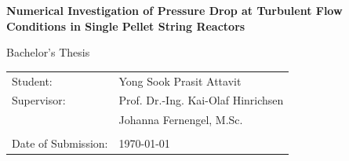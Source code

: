 %
%
%
\begin{titlepage}
	\thispagestyle{firstpage}
	\vspace*{1cm}
	\begingroup 
	\fontsize{30}{30}\sffamily\selectfont
	\textbf{Numerical Investigation of Pressure \newline Drop at Turbulent Flow Conditions in Single Pellet String Reactors}
	\par
	\endgroup
	
	\begingroup
	\fontsize{24}{24}\sffamily\selectfont
	\par
	\endgroup
	
	\vspace*{1cm}
	\begingroup 
	\fontsize{24}{24}\sffamily\selectfont
	Bachelor's Thesis \\
	\par
	\endgroup
	\vfill
%	
	\begin{tabular}{@{}ll@{}}
		Student:  & Yong Sook Prasit Attavit				\\
		Supervisor: & Prof. Dr.-Ing. Kai-Olaf Hinrichsen\\
                  &        Johanna Fernengel, M.Sc.\\
								& \\[-0.1cm]
		Date of Submission:     & {\today} \\
	\end{tabular}
	\vspace{2em}
	\cleardoublepage
\end{titlepage}
%
%
%